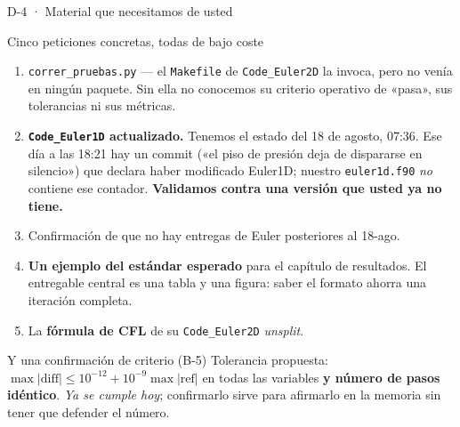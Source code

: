 \documentclass[aspectratio=169,10pt]{beamer}
\newcommand{\cod}[1]{\texttt{\small #1}}
\begin{document}
\begin{frame}[shrink]{D-4 · Material que necesitamos de usted}

  \begin{alertblock}{Cinco peticiones concretas, todas de bajo coste}
    \small
    \begin{enumerate}
      \item \cod{correr\_pruebas.py} — el \cod{Makefile} de \cod{Code\_Euler2D} la
            invoca, pero no venía en ningún paquete. Sin ella no conocemos su
            criterio operativo de «pasa», sus tolerancias ni sus métricas.
      \item \textbf{\cod{Code\_Euler1D} actualizado.} Tenemos el estado del 18 de
            agosto, 07:36. Ese día a las 18:21 hay un commit («el piso de presión
            deja de dispararse en silencio») que declara haber modificado Euler1D;
            nuestro \cod{euler1d.f90} \emph{no} contiene ese contador.
            \textbf{Validamos contra una versión que usted ya no tiene.}
      \item Confirmación de que no hay entregas de Euler posteriores al 18-ago.
      \item \textbf{Un ejemplo del estándar esperado} para el capítulo de
            resultados. El entregable central es una tabla y una figura: saber el
            formato ahorra una iteración completa.
      \item La \textbf{fórmula de CFL} de su \cod{Code\_Euler2D} \emph{unsplit}.
    \end{enumerate}
  \end{alertblock}

  \begin{block}{Y una confirmación de criterio (B-5)}
    \small
    Tolerancia propuesta:
    $\max|\text{diff}| \le 10^{-12} + 10^{-9}\max|\text{ref}|$ en todas las
    variables \textbf{y número de pasos idéntico}. \emph{Ya se cumple hoy};
    confirmarlo sirve para afirmarlo en la memoria sin tener que defender el número.
  \end{block}
\end{frame}
\end{document}
